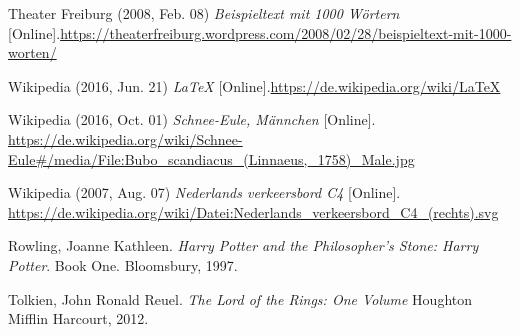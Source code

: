 \documentclass{scrreprt}
\begin{document}
	\begin{thebibliography}{mmmmmmm}
	\label{bib:thebib}
		 Theater Freiburg (2008, Feb. 08) \textit{Beispieltext mit 1000 Wörtern} [Online].\newline \url{https://theaterfreiburg.wordpress.com/2008/02/28/beispieltext-mit-1000-worten/} 
		
		 Wikipedia (2016, Jun. 21) \textit{LaTeX} [Online].\newline \url{https://de.wikipedia.org/wiki/LaTeX} 
		
		 Wikipedia (2016, Oct. 01) \textit{Schnee-Eule, Männchen} [Online]. \newline
		\url{https://de.wikipedia.org/wiki/Schnee-Eule#/media/File:Bubo_scandiacus_(Linnaeus,_1758)_Male.jpg}
		
		 Wikipedia (2007, Aug. 07) \textit{Nederlands verkeersbord C4} [Online]. \newline
		\url{https://de.wikipedia.org/wiki/Datei:Nederlands_verkeersbord_C4_(rechts).svg}
		
		 Rowling, Joanne Kathleen. \textit{Harry Potter and the Philosopher's Stone: Harry Potter}. Book One. Bloomsbury, 1997.
		
		 Tolkien, John Ronald Reuel. \textit{The Lord of the Rings: One Volume} Houghton Mifflin Harcourt, 2012.
		
		
	
	
	\end{thebibliography}
\end{document}
